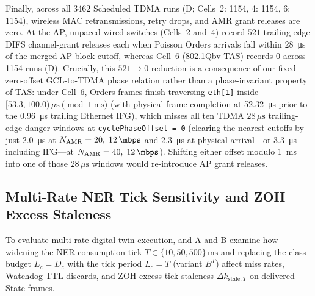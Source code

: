 \documentclass[11pt,a4paper]{article}
\newcommand{\Namr}{\ensuremath{N_{\mathrm{AMR}}}}
\begin{document}
Finally, across all \num{3462} Scheduled TDMA runs (D; Cells~2: \num{1154}, 4: \num{1154}, 6: \num{1154}), wireless MAC retransmissions, retry drops, and AMR grant releases are zero. At the AP, unpaced wired switches (Cells~2 and~4) record $521$ trailing-edge DIFS channel-grant releases each when Poisson Orders arrivals fall within \qty{28}{\micro\second} of the merged AP block cutoff, whereas Cell~6 (802.1Qbv TAS) records $0$ across \num{1154} runs (D). Crucially, this $521 \to 0$ reduction is a consequence of our fixed zero-offset GCL-to-TDMA phase relation rather than a phase-invariant property of TAS: under Cell~6, Orders frames finish traversing \texttt{eth[1]} inside $[53.3, 100.0)\,\mu\text{s} \pmod{\qty{1}{\milli\second}}$ (with physical frame completion at \qty{52.32}{\micro\second} prior to the \qty{0.96}{\micro\second} trailing Ethernet IFG), which misses all ten TDMA $28\,\mu\text{s}$ trailing-edge danger windows at \texttt{cyclePhaseOffset = 0} (clearing the nearest cutoffs by just \qty{2.0}{\micro\second} at $\Namr=20,\; \qty{12}{\mbps}$ and \qty{2.3}{\micro\second} at physical arrival---or \qty{3.3}{\micro\second} including IFG---at $\Namr=40,\; \qty{12}{\mbps}$). Shifting either offset modulo \qty{1}{\milli\second} into one of those $28\,\mu\text{s}$ windows would re-introduce AP grant releases.

\subsection{Multi-Rate NER Tick Sensitivity and ZOH Excess Staleness}
\label{sec:ner_multirate}

To evaluate multi-rate digital-twin execution,  and A and B examine how widening the NER consumption tick $T \in \{10, 50, 500\}\,\text{ms}$ and replacing the class budget $L_c = D_c$ with the tick period $L_c = T$ (variant $B^T$) affect miss rates, Watchdog TTL discards, and ZOH excess tick staleness $\Delta k_{\mathrm{stale},T}$ on delivered State frames.
\end{document}

